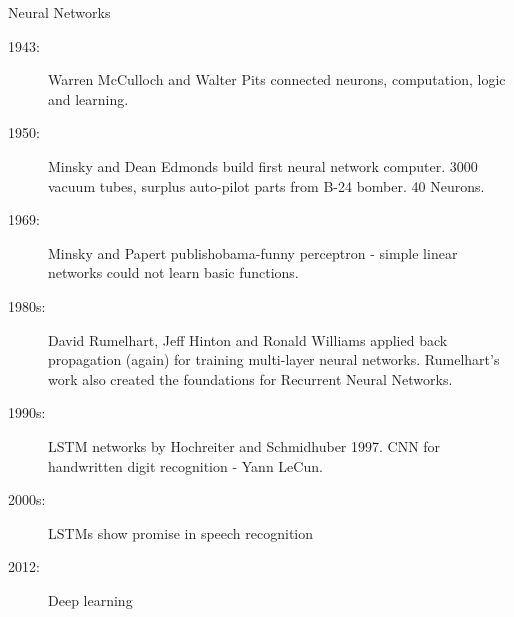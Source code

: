 \begin{frame}{Neural Networks}
	
	{\scriptsize 
	\begin{description}
		\item[1943:] Warren McCulloch and Walter Pits connected neurons, computation, logic and learning.
		\item[1950:] Minsky and Dean Edmonds build first neural network computer. 3000 vacuum tubes, surplus 
		auto-pilot parts from B-24 bomber. 40 Neurons. 
		\item[1969:] Minsky and Papert publishobama-funny perceptron - simple linear networks could not learn basic 
		functions. 
		\item[1980s:] David Rumelhart, Jeff Hinton and Ronald Williams applied back propagation 
		(again) for training multi-layer neural networks. Rumelhart's work also created the foundations for 
		Recurrent Neural Networks. 
		\item[1990s:] LSTM networks by Hochreiter and Schmidhuber 1997. CNN for handwritten digit recognition - Yann LeCun. 
		\item[2000s:] LSTMs show promise in speech recognition 
		\item[2012:] Deep learning
	\end{description}
	}
\end{frame}

